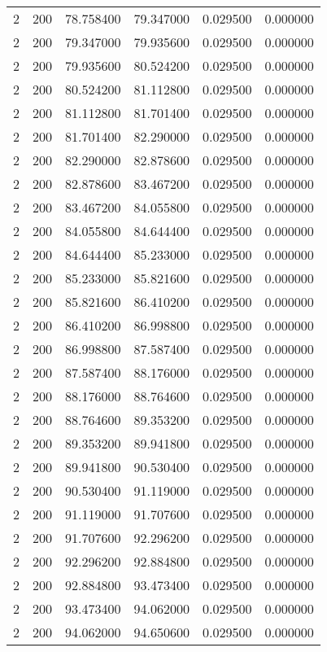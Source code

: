 \begin{longtable}{rrrrrr}
2 & 200 & 78.758400 & 79.347000 & 0.029500 & 0.000000 \\
2 & 200 & 79.347000 & 79.935600 & 0.029500 & 0.000000 \\
2 & 200 & 79.935600 & 80.524200 & 0.029500 & 0.000000 \\
2 & 200 & 80.524200 & 81.112800 & 0.029500 & 0.000000 \\
2 & 200 & 81.112800 & 81.701400 & 0.029500 & 0.000000 \\
2 & 200 & 81.701400 & 82.290000 & 0.029500 & 0.000000 \\
2 & 200 & 82.290000 & 82.878600 & 0.029500 & 0.000000 \\
2 & 200 & 82.878600 & 83.467200 & 0.029500 & 0.000000 \\
2 & 200 & 83.467200 & 84.055800 & 0.029500 & 0.000000 \\
2 & 200 & 84.055800 & 84.644400 & 0.029500 & 0.000000 \\
2 & 200 & 84.644400 & 85.233000 & 0.029500 & 0.000000 \\
2 & 200 & 85.233000 & 85.821600 & 0.029500 & 0.000000 \\
2 & 200 & 85.821600 & 86.410200 & 0.029500 & 0.000000 \\
2 & 200 & 86.410200 & 86.998800 & 0.029500 & 0.000000 \\
2 & 200 & 86.998800 & 87.587400 & 0.029500 & 0.000000 \\
2 & 200 & 87.587400 & 88.176000 & 0.029500 & 0.000000 \\
2 & 200 & 88.176000 & 88.764600 & 0.029500 & 0.000000 \\
2 & 200 & 88.764600 & 89.353200 & 0.029500 & 0.000000 \\
2 & 200 & 89.353200 & 89.941800 & 0.029500 & 0.000000 \\
2 & 200 & 89.941800 & 90.530400 & 0.029500 & 0.000000 \\
2 & 200 & 90.530400 & 91.119000 & 0.029500 & 0.000000 \\
2 & 200 & 91.119000 & 91.707600 & 0.029500 & 0.000000 \\
2 & 200 & 91.707600 & 92.296200 & 0.029500 & 0.000000 \\
2 & 200 & 92.296200 & 92.884800 & 0.029500 & 0.000000 \\
2 & 200 & 92.884800 & 93.473400 & 0.029500 & 0.000000 \\
2 & 200 & 93.473400 & 94.062000 & 0.029500 & 0.000000 \\
2 & 200 & 94.062000 & 94.650600 & 0.029500 & 0.000000 \\

\end{longtable}
